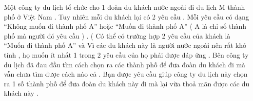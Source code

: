 Một công ty du lịch tổ chức cho 1 đoàn du khách nước ngoài đi du lịch M thành phố ở Việt Nam . Tuy nhiên mỗi du khách lại có 2 yêu cầu . Mỗi yêu cầu có dạng “Không muốn đi thành phố A” hoặc “Muốn đi thành phố A” ( A là chỉ số thành phố mà người đó yêu cầu ) . ( Có thể có trường hợp 2 yêu cầu của khách là “Muốn đi thành phố A” và  Vì các du khách này là người nước ngoài nên rất khó tính , họ muốn ít nhất  1 trong 2 yêu cầu của họ phải được đáp ứng . Bên công ty du lịch đã đau đầu tìm cách chọn ra các thành phố để đưa đoàn du khách đi mà vẫn chưa tìm được cách nào cả . Bạn được yêu cầu giúp công ty du lịch này chọn ra 1 số thành phố để đưa đoàn du khách này đi mà lại vừa thoả mãn được các du khách này .  

\